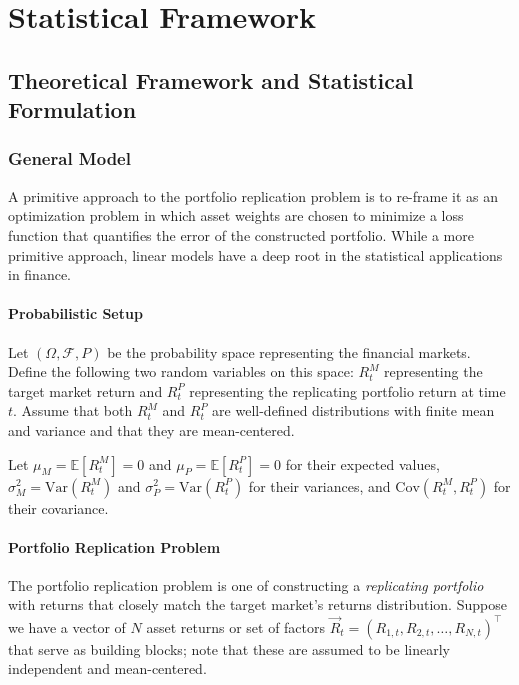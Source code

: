 \chapter{Statistical Framework}

\section{Theoretical Framework and Statistical Formulation}

\subsection{General Model}

A primitive approach to the portfolio replication problem is to re-frame it as an optimization problem in which asset weights are chosen to minimize a loss function that quantifies the error of the constructed portfolio. While a more primitive approach, linear models have a deep root in the statistical applications in finance. 

\subsubsection{Probabilistic Setup}

Let $(\Omega, \mathcal{F}, P)$ be the probability space representing the financial markets. Define the following two random variables on this space: $R^M_t$ representing the target market return and $R^P_t$ representing the replicating portfolio return at time $t$. Assume that both $R^M_t$ and $R^P_t$ are well-defined distributions with finite mean and variance and that they are mean-centered.

Let $\mu_M = \mathbb{E}[R^M_t]=0$ and $\mu_P = \mathbb{E}[R^P_t]=0$ for their expected values, $\sigma_M^2 = \mathrm{Var}(R^M_t)$ and $\sigma_P^2 = \mathrm{Var}(R^P_t)$ for their variances, and $\mathrm{Cov}(R^M_t, R^P_t)$ for their covariance.

\subsubsection{Portfolio Replication Problem}

The portfolio replication problem is one of constructing a \textit{replicating portfolio} with returns that closely match the target market’s returns distribution. Suppose we have a vector of $N$ asset returns or set of factors $\vec{R}_t=(R_{1,t}, R_{2,t}, \dots, R_{N,t})^\top$ that serve as building blocks; note that these are assumed to be linearly independent and mean-centered.

